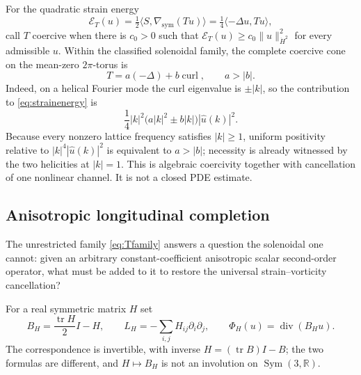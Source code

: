 \documentclass[11pt]{article}
\theoremstyle{definition}
\theoremstyle{remark}
\theoremstyle{plain}
\DeclareMathOperator{\curl}{curl}
\DeclareMathOperator{\dv}{div}
\DeclareMathOperator{\Sym}{Sym}
\DeclareMathOperator{\tr}{tr}
\newcommand{\R}{\mathbb{R}}
\newcommand{\gsym}{\nabla_{\mathrm{sym}}}
\begin{document}
For the quadratic strain energy
\begin{equation}
\label{eq:strainenergy}
\mathcal E_{T}(u)
=\tfrac12\langle S,\gsym(Tu)\rangle
=\tfrac14\langle-\Delta u,Tu\rangle ,
\end{equation}
call $T$ coercive when there is $c_{0}>0$ such that
$\mathcal E_{T}(u)\ge c_{0}\|u\|_{\dot H^{2}}^{2}$ for every admissible $u$.
Within the classified solenoidal family, the complete coercive cone on the
mean-zero $2\pi$-torus is
\begin{equation}
\label{eq:cone}
T=a(-\Delta)+b\curl,
\qquad
a>|b| .
\end{equation}
Indeed, on a helical Fourier mode the curl eigenvalue is
$\pm|k|$, so the contribution to \eqref{eq:strainenergy} is
\[
\frac14|k|^{2}\bigl(a|k|^{2}\pm b|k|\bigr)|\widehat u(k)|^{2}.
\]
Because every nonzero lattice frequency satisfies $|k|\ge1$, uniform
positivity relative to $|k|^{4}|\widehat u(k)|^{2}$ is equivalent to
$a>|b|$; necessity is already witnessed by the two helicities at
$|k|=1$. This is algebraic coercivity together with cancellation of one
nonlinear channel. It is not a closed PDE estimate.

\subsection{Anisotropic longitudinal completion}
\label{subsec:anisotropic}

The unrestricted family \eqref{eq:Tfamily} answers a question the solenoidal
one cannot: given an arbitrary constant-coefficient anisotropic scalar
second-order operator, what must be added to it to restore the universal
strain--vorticity cancellation?

For a real symmetric matrix $H$ set
\begin{equation}
\label{eq:Hcorrespondence}
B_{H}=\frac{\tr H}{2}I-H,
\qquad
L_{H}=-\sum_{i,j}H_{ij}\partial_{i}\partial_{j},
\qquad
\Phi_{H}(u)=\dv(B_{H}u).
\end{equation}
The correspondence is invertible, with inverse $H=(\tr B)I-B$; the two
formulas are different, and $H\mapsto B_{H}$ is not an involution on
$\Sym(3,\R)$.
\end{document}
